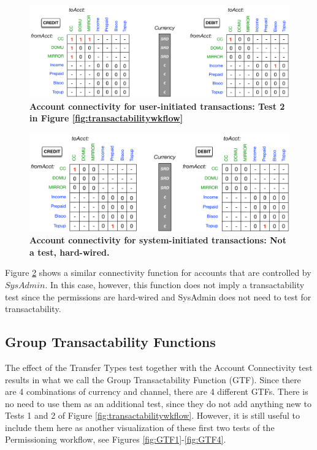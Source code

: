 \begin{figure}[h]
\vspace{-0.5cm}
\centering
\includegraphics[width=16cm]{Figures/User_Acct_Connectivity}
\caption{\small\textbf{Account connectivity for user-initiated transactions: Test 2 in Figure \ref{fig:transactabilitywkflow}}}
\label{fig:User_Acct_Connectivity}
\end{figure}

\begin{figure}[H]
\vspace{-1cm}
\centering
\includegraphics[width=16cm]{Figures/SysAdmin_Acct_Connectivity}
\caption{\small\textbf{Account connectivity for system-initiated transactions: Not a test, hard-wired. }}
\label{fig:SysAdmin_Acct_Connectivity}
\end{figure}

Figure \ref{fig:SysAdmin_Acct_Connectivity} shows a similar connectivity function for accounts that are controlled by $SysAdmin$. In this case, however, this function does not imply a transactability test since the permissions are hard-wired and SysAdmin does not need to test for transactability.

\subsection{Group Transactability Functions}
The effect of the Transfer Types test together with the Account Connectivity test results in what we call the Group Transactability Function (GTF). Since there are 4 combinations of currency and channel, there are 4 different GTFs. There is no need to use them as an additional test, since they do not add anything new to Tests 1 and 2 of Figure \ref{fig:transactabilitywkflow}. However, it is still useful to include them here as another visualization of these first two tests of the Permissioning workflow, see Figures \ref{fig:GTF1}-\ref{fig:GTF4}.

